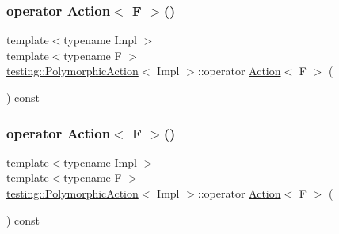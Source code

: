 \mbox{\label{classtesting_1_1_polymorphic_action_ac35461616cc15c06f1a2f9ee1c03fb8f}} 
\subsubsection{\texorpdfstring{operator Action$<$ F $>$()}{operator Action< F >()}\hspace{0.1cm}{\footnotesize\ttfamily [2/3]}}
{\footnotesize\ttfamily template$<$typename Impl $>$ \\
template$<$typename F $>$ \\
\mbox{\hyperlink{classtesting_1_1_polymorphic_action}{testing\+::\+Polymorphic\+Action}}$<$ Impl $>$\+::operator \mbox{\hyperlink{classtesting_1_1_action}{Action}}$<$ F $>$ (\begin{DoxyParamCaption}{ }\end{DoxyParamCaption}) const\hspace{0.3cm}{\ttfamily [inline]}}

\mbox{\label{classtesting_1_1_polymorphic_action_ac35461616cc15c06f1a2f9ee1c03fb8f}} 
\subsubsection{\texorpdfstring{operator Action$<$ F $>$()}{operator Action< F >()}\hspace{0.1cm}{\footnotesize\ttfamily [3/3]}}
{\footnotesize\ttfamily template$<$typename Impl $>$ \\
template$<$typename F $>$ \\
\mbox{\hyperlink{classtesting_1_1_polymorphic_action}{testing\+::\+Polymorphic\+Action}}$<$ Impl $>$\+::operator \mbox{\hyperlink{classtesting_1_1_action}{Action}}$<$ F $>$ (\begin{DoxyParamCaption}{ }\end{DoxyParamCaption}) const\hspace{0.3cm}{\ttfamily [inline]}}



